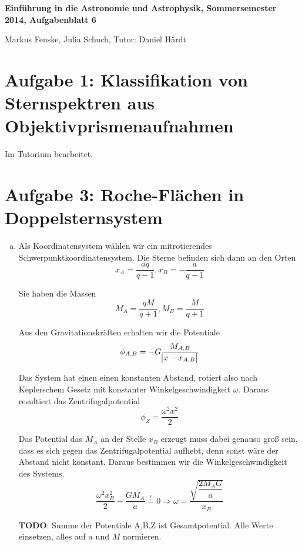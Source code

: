 \documentclass[a4paper,german,12pt,smallheadings]{scrartcl}
\begin{document}
\allowdisplaybreaks %
\begin{center}
\bfseries %
\sffamily %
\vspace{-40pt}
Einführung in die Astronomie und Astrophysik, Sommersemester 2014, Aufgabenblatt 6

Markus Fenske, Julia Schuch, Tutor: Daniel Härdt
\vspace{-10pt}
\end{center}
\section*{Aufgabe 1: Klassifikation von Sternspektren aus Objektivprismenaufnahmen}
Im Tutorium bearbeitet.

\section*{Aufgabe 3: Roche-Flächen in Doppelsternsystem}
\begin{enumerate}[a)]
  \item
    Als Koordinatensystem wählen wir ein mitrotierendes
    Schwerpunktkoordinatensystem. Die Sterne befinden sich dann an den Orten
    \begin{equation}
      x_A = \frac{aq}{q-1}, x_B = -\frac{a}{q-1}
    \end{equation}

    Sie haben die Massen
    \begin{equation}
      M_A = \frac{qM}{q+1}, M_B = \frac{M}{q+1}
    \end{equation}

    Aus den Gravitationskräften erhalten wir die Potentiale
    \begin{equation}
      \phi_{A,B} = -G \frac{M_{A,B}}{\envert{x - x_{A,B}}}
    \end{equation}

    Das System hat einen einen konstanten Abstand, rotiert also nach
    Keplerschem Gesetz mit konstanter Winkelgeschwindigkeit $\omega$. Daraus
    resultiert das Zentrifugalpotential
    \begin{equation}
      \phi_Z = \frac{\omega^2 x^2}{2}
    \end{equation}

    Das Potential das $M_A$ an der Stelle $x_B$ erzeugt muss dabei genauso groß
    sein, dass es sich gegen das Zentrifugalpotential aufhebt, denn sonst wäre
    der Abstand nicht konstant. Daraus bestimmen wir die Winkelgeschwindigkeit
    des Systems.
    \begin{equation}
      \frac{\omega^2 x_B^2}{2} - \frac{GM_A}{a} \overset{!}{=} 0 \Rightarrow \omega = \frac{\sqrt{\dfrac{2 M_A G}{a}}}{x_B}
    \end{equation}

    \textbf{TODO}: Summe der Potentiale A,B,Z ist
    Gesamtpotential. Alle Werte einsetzen, alles auf $a$ und
    $M$ normieren.
\end{enumerate}
\end{document}

